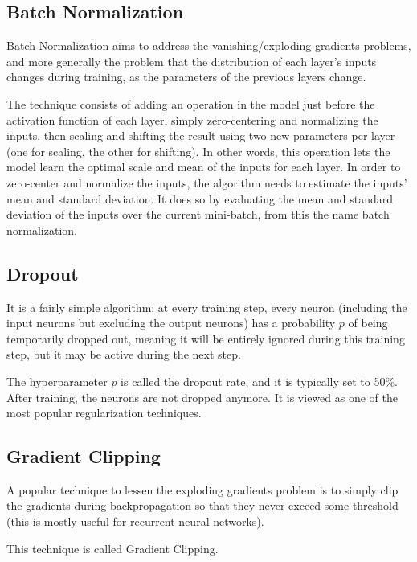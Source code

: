 \documentclass[%
oneside,                 %
final,                   %
10pt]{article}
\begin{document}
\noindent
\subsection{Batch Normalization}

Batch Normalization
aims to address the vanishing/exploding gradients problems, and more generally the problem that the
distribution of each layer’s inputs changes during training, as the parameters of the previous layers change.

The technique consists of adding an operation in the model just before the activation function of each
layer, simply zero-centering and normalizing the inputs, then scaling and shifting the result using two new
parameters per layer (one for scaling, the other for shifting). In other words, this operation lets the model
learn the optimal scale and mean of the inputs for each layer.
In order to zero-center and normalize the inputs, the algorithm needs to estimate the inputs’ mean and
standard deviation. It does so by evaluating the mean and standard deviation of the inputs over the current
mini-batch, from this the name batch normalization.

\subsection{Dropout}

It is a fairly simple algorithm: at every training step, every neuron (including the input neurons but
excluding the output neurons) has a probability $p$ of being temporarily dropped out, meaning it will be
entirely ignored during this training step, but it may be active during the next step.

The
hyperparameter $p$ is called the dropout rate, and it is typically set to 50\%. After training, the neurons are not dropped anymore.
 It is viewed as one of the most popular regularization techniques.

\subsection{Gradient Clipping}

A popular technique to lessen the exploding gradients problem is to simply clip the gradients during
backpropagation so that they never exceed some threshold (this is mostly useful for recurrent neural
networks).

This technique is called Gradient Clipping.
\end{document}
